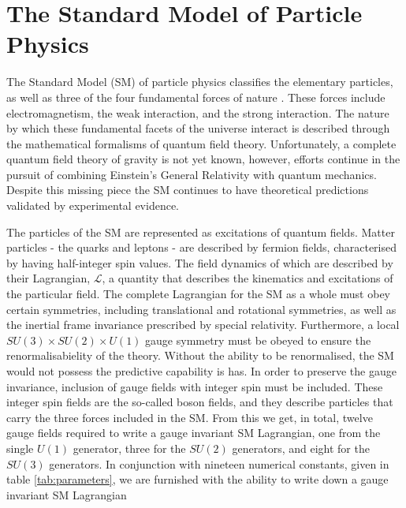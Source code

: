 \section{The Standard Model of Particle Physics}
The Standard Model (SM) of particle physics classifies the elementary particles, as well as three of the four fundamental forces of nature \cite{oerter2006theory}. 
These forces include electromagnetism, the weak interaction, and the strong interaction.
The nature by which these fundamental facets of the universe interact is described through the mathematical formalisms of quantum field theory.
Unfortunately, a complete quantum field theory of gravity is not yet known, however, efforts continue in the pursuit of combining Einstein's General Relativity with quantum mechanics.
Despite this missing piece the SM continues to have theoretical predictions validated by experimental evidence.

The particles of the SM are represented as excitations of quantum fields.
Matter particles - the quarks and leptons - are described by fermion fields, characterised by having half-integer spin values.
The field dynamics of which are described by their Lagrangian, $\mathcal{L}$, a quantity that describes the kinematics and excitations of the particular field. 
The complete Lagrangian for the SM as a whole must obey certain symmetries, including translational and rotational symmetries, as well as the inertial frame invariance prescribed by special relativity.
Furthermore, a local $SU(3) \times SU(2) \times U(1)$ gauge symmetry must be obeyed to ensure the renormalisabielity of the theory. 
Without the ability to be renormalised, the SM would not possess the predictive capability is has.
In order to preserve the gauge invariance, inclusion of gauge fields with integer spin must be included.
These integer spin fields are the so-called boson fields, and they describe particles that carry the three forces included in the SM.
From this we get, in total, twelve gauge fields required to write a gauge invariant SM Lagrangian, one from the single $U(1)$ generator, three for the $SU(2)$ generators, and eight for the $SU(3)$ generators.
In conjunction with nineteen numerical constants, given in table \ref{tab:parameters}, we are furnished with the ability to write down a gauge invariant SM Lagrangian

